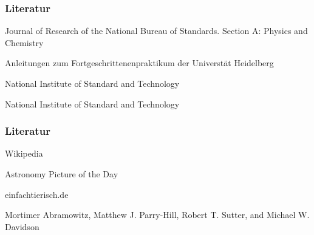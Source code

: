 \documentclass[compress]{beamer}
\begin{document}
\begin{frame}
    \frametitle{Literatur}

    \vspace{0.2cm} %
    \begin{thebibliography}{10}
	
	\beamertemplatearticlebibitems
        Journal of Research of the National Bureau of Standards. Section A: Physics and Chemistry
	\newblock {}
	
	\beamertemplatearticlebibitems
        Anleitungen zum Fortgeschrittenenpraktikum der Universt\"at Heidelberg
	\newblock {}
	
	\beamertemplatearticlebibitems
        National Institute of Standard and Technology
	\newblock {}
	
	\beamertemplatearticlebibitems
        National Institute of Standard and Technology
	\newblock {}
	
	


    \end{thebibliography}

 
\end{frame}

\begin{frame}
    \frametitle{Literatur}

    \vspace{0.2cm} %
    \begin{thebibliography}{10}
	
	\beamertemplateonlinebibitems
        Wikipedia
	\newblock {}
	
	\beamertemplateonlinebibitems
        Astronomy Picture of the Day
	\newblock {}
	
	\beamertemplateonlinebibitems
        einfachtierisch.de
	\newblock {}
	
	\beamertemplateonlinebibitems
        Mortimer Abramowitz, Matthew J. Parry-Hill, Robert T. Sutter, and Michael W. Davidson
	\newblock {}
	
	


    \end{thebibliography}

 
\end{frame}
\end{document}
